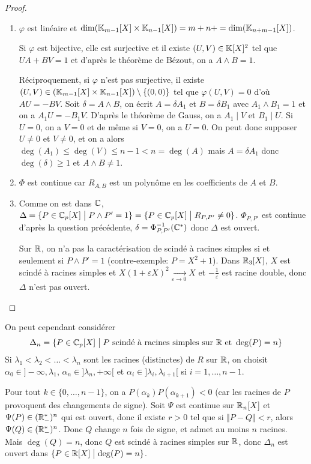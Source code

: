\begin{proof}
	\phantom{}
	\begin{enumerate}
		\item $\varphi$ est linéaire et $\dim(\mathbb{K}_{m-1}[X]\times\mathbb{K}_{n-1}[X])=m+n+=\dim(\mathbb{K}_{n+m-1}[X])$.
		
		Si $\varphi$ est bijective, elle est surjective et il existe $(U,V)\in\mathbb{K}[X]^{2}$ tel que $UA+BV=1$ et d'après le théorème de Bézout, on a $A\wedge B=1$.

		Réciproquement, si $\varphi$ n'est pas surjective, il existe $(U,V)\in(\mathbb{K}_{m-1}[X]\times\mathbb{K}_{n-1}[X])\setminus\{(0,0)\}$ tel que $\varphi(U,V)=0$ d'où $AU=-BV$. Soit $\delta=A\wedge B$, on écrit $A=\delta A_{1}$ et $B=\delta B_{1}$ avec $A_{1}\wedge B_{1}=1$ et on a $A_{1}U=-B_{1}V$. D'après le théorème de Gauss, on a $A_{1}\mid V$ et $B_{1}\mid U$. Si $U=0$, on a $V=0$ et de même si $V=0$, on a $U=0$. On peut donc supposer $U\neq0$ et $V\neq 0$, et on a alors $\deg(A_{1})\leqslant\deg(V)\leqslant n-1<n=\deg(A)$ mais $A=\delta A_{1}$ donc $\deg(\delta)\geqslant1$ et $A\wedge B\neq 1$.

		\item $\Phi$ est continue car $R_{A,B}$ est un polynôme en les coefficients de $A$ et $B$.
		
		\item Comme on est dans $\mathbb{C}$, $\Delta=\{P\in\mathbb{C}_{p}[X]\bigm| P\wedge P'=1\}=\{P\in\mathbb{C}_p[X]\bigm| R_{P,P'}\neq0\}$. $\Phi_{P,P'}$ est continue d'après la question précédente, $\delta=\Phi_{P,P'}^{-1}(\mathbb{C}^{*})$ donc $\Delta$ est ouvert.
		
		Sur $\mathbb{R}$, on n'a pas la caractérisation de scindé à racines simples si et seulement si $P\wedge P'=1$ (contre-exemple: $P=X^{2}+1$). Dans $\mathbb{R}_{3}[X]$, $X$ est scindé à racines simples et $X(1+\varepsilon X)^{2}\xrightarrow[\varepsilon\to0]{}X$ et $-\frac{1}{\varepsilon}$ est racine double, donc $\Delta$ n'est pas ouvert.
	\end{enumerate}
\end{proof}

\begin{remark}
	On peut cependant considérer 
	\begin{equation}\Delta_{n}=\{P\in\mathbb{C}_{p}[X]\bigm| P\text{ scindé à racines simples sur }\mathbb{R}\text{ et }\deg(P)=n\}\end{equation}
	Si $\lambda_{1}<\lambda_{2}<\dots<\lambda_{n}$ sont les racines (distinctes) de $R$ sur $\mathbb{R}$, on choisit $\alpha_{0}\in]-\infty,\lambda_{1}$, $\alpha_{n}\in]\lambda_{n},+\infty[$ et $\alpha_{i}\in]\lambda_{i},\lambda_{i+1}[$ si $i=1,\dots,n-1$. 

	Pour tout $k\in\{0,\dots,n-1\}$, on a $P(\alpha_{k})P(\alpha_{k+1})<0$ (car les racines de $P$ provoquent des changements de signe). Soit 
	$\Psi$ est continue sur $\mathbb{R}_{n}[X]$ et $\Psi(P)\in(\mathbb{R}_{-}^{*})^{n}$ qui est ouvert, donc il existe $r>0$ tel que si $\Vert P-Q\Vert<r$, alors $\Psi(Q)\in(\mathbb{R}_{-}^{*})^{n}$. Donc $Q$ change $n$ fois de signe, et admet au moins $n$ racines. Mais $\deg(Q)=n$, donc $Q$ est scindé à racines simples sur $\mathbb{R}$, donc $\Delta_{n}$ est ouvert dans $\{P\in\mathbb{R}[X]\bigm|\deg(P)=n\}$.
\end{remark}

